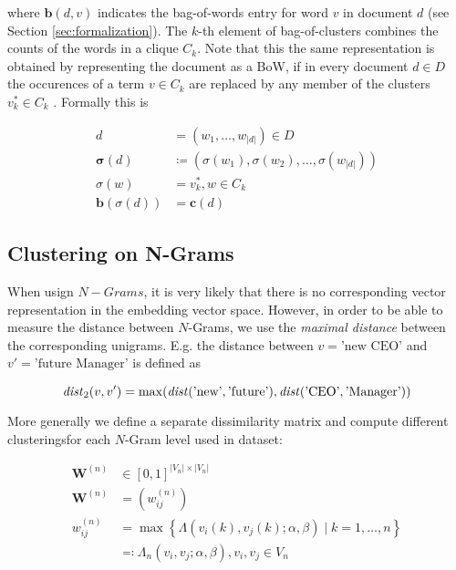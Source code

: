 where $\mathbf{b}(d,v)$ indicates the bag-of-words entry for word $v$ in
document $d$ (see Section \ref{sec:formalization}). The $k$-th element of
bag-of-clusters combines the counts of the words in a clique $C_k$. Note that this
the same representation is obtained by representing the document as
a BoW, if in every document $d \in D$ the occurences of a term $v \in C_k$
are replaced by any member of the clusters $v_k^* \in C_k$ . Formally this is

\begin{equation*}
\begin{split}
	d &= (w_1,\ldots,w_{|d|}) \in D \\
	\boldsymbol\sigma(d) &\coloneqq (\sigma(w_1),
	\sigma(w_2),\ldots,\sigma(w_{|d|}))
	\\
	\sigma(w) &= v_k^*, w \in C_k \\ 
	\mathbf{b}(\sigma(d)) &= \mathbf{c}(d)
\end{split}
\end{equation*}

\subsection{Clustering on N-Grams}

When usign $N-Grams$, it is very likely that there is no
corresponding vector representation in the embedding vector space. However, in
order to be able to measure the distance between $N$-Grams, we use the
\emph{maximal distance} between the corresponding unigrams. E.g. the distance
between $v=\text{'new CEO'}$ and $v'=\text{'future Manager'}$ is defined
as

\begin{equation*}
	\mathit{dist}_2(v,v') = \max(\mathit{dist}(\text{'new'}, \text{{'future'}}),
	\mathit{dist}(\text{'CEO'}, \text{'Manager')})
\end{equation*}

More generally we define a separate dissimilarity matrix and compute
different clusteringsfor each $N$-Gram level used in dataset:

\begin{equation*}
\begin{split}
	\mathbf{W}^{(n)} &\in [0,1]^{|V_n|\times|V_n|} \\
	\mathbf{W}^{(n)} &= \left(w^{(n)}_{ij}\right) \\
	w^{(n)}_{ij} &= \max\left\{ \Lambda\left(v_i(k), v_j(k); \alpha,
	\beta\right) \mid k = 1,\ldots,n\right\} \\
	&\eqqcolon \Lambda_n(v_i,v_j;\alpha,\beta), v_i, v_j \in V_n
\end{split}
\end{equation*}

